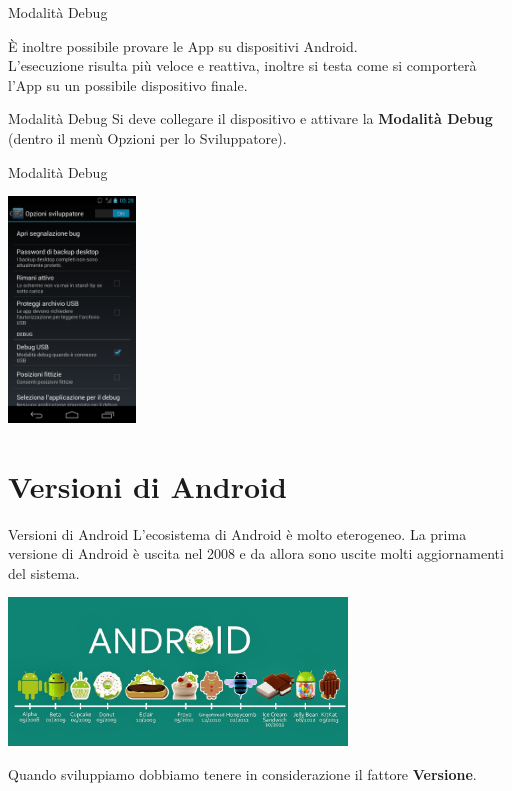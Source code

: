\documentclass[xcolor=svgnames,11pt]{beamer}
\begin{document}
\begin{frame}{Modalit\`a Debug}

	\`E inoltre possibile provare le App su dispositivi Android.\\
	\pause
	\medskip
	L'esecuzione risulta pi\`u veloce e reattiva, inoltre si testa come si comporter\`a l'App su un possibile dispositivo finale.\\
	\pause
	\medskip
	\begin{block}{Modalit\`a Debug}
	Si deve collegare il dispositivo e attivare la \textbf{Modalit\`a Debug} (dentro il men\`u Opzioni per lo Sviluppatore).
	\end{block}	

\end{frame}


\begin{frame}{Modalit\`a Debug}
\begin{center}
\includegraphics[height=6cm]{debug.png}
\end{center}
\end{frame}

\section{Versioni di Android}

\begin{frame}{Versioni di Android}
L'ecosistema di Android \`e molto eterogeneo. La prima versione di Android \`e uscita nel 2008 e da allora sono uscite molti aggiornamenti del sistema.

\medskip

\begin{center}

\includegraphics[width=9cm]{versions.jpg}

\end{center}

\pause
\medskip

Quando sviluppiamo dobbiamo tenere in considerazione il fattore \textbf{Versione}.

\end{frame}
\end{document}

